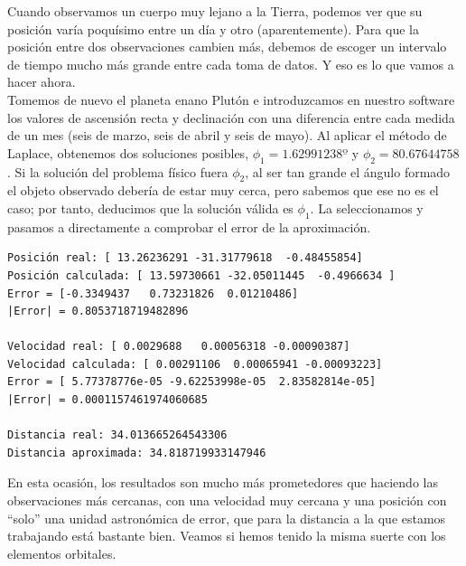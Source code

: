 Cuando observamos un cuerpo muy lejano a la Tierra, podemos ver que su posición varía poquísimo entre un día y otro (aparentemente). Para que la posición entre dos observaciones cambien más, debemos de escoger un intervalo de tiempo mucho más grande entre cada toma de datos. Y eso es lo que vamos a hacer ahora.\\

Tomemos de nuevo el planeta enano Plutón e introduzcamos en nuestro software los valores de ascensión recta y declinación con una diferencia entre cada medida de un mes (seis de marzo, seis de abril y seis de mayo). Al aplicar el método de Laplace, obtenemos dos soluciones posibles, $\phi_1=1.62991238º$ y $\phi_2=80.67644758$. Si la solución del problema físico fuera $\phi_2$, al ser tan grande el ángulo formado el objeto observado debería de estar muy cerca, pero sabemos que ese no es el caso; por tanto, deducimos que la solución válida es $\phi_1$. La seleccionamos y pasamos a directamente a comprobar el error de la aproximación.
\begin{lstlisting}[style=Console]
Posición real: [ 13.26236291 -31.31779618  -0.48455854]
Posición calculada: [ 13.59730661 -32.05011445  -0.4966634 ]
Error = [-0.3349437   0.73231826  0.01210486]
|Error| = 0.8053718719482896

Velocidad real: [ 0.0029688   0.00056318 -0.00090387]
Velocidad calculada: [ 0.00291106  0.00065941 -0.00093223]
Error = [ 5.77378776e-05 -9.62253998e-05  2.83582814e-05]
|Error| = 0.0001157461974060685

Distancia real: 34.013665264543306
Distancia aproximada: 34.818719933147946
\end{lstlisting}

En esta ocasión, los resultados son mucho más prometedores que haciendo las observaciones más cercanas, con una velocidad muy cercana y una posición con ``solo'' una unidad astronómica de error, que para la distancia a la que estamos trabajando está bastante bien. Veamos si hemos tenido la misma suerte con los elementos orbitales.

